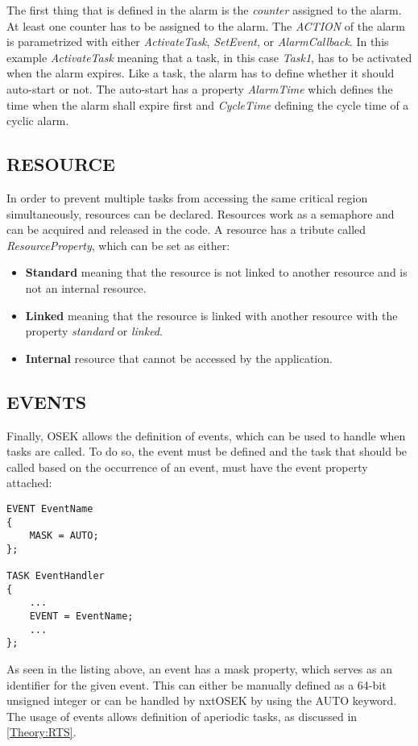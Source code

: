 The first thing that is defined in the alarm is the \textit{counter} assigned to the alarm.
At least one counter has to be assigned to the alarm.
The \textit{ACTION} of the alarm is parametrized with either \textit{ActivateTask}, \textit{SetEvent}, or \textit{AlarmCallback}\cite{irisa25}.
In this example \textit{ActivateTask} meaning that a task, in this case \textit{Task1}, has to be activated when the alarm expires.
Like a task, the alarm has to define whether it should auto-start or not.
The auto-start has a property \textit{AlarmTime} which defines the time when the alarm shall expire first and \textit{CycleTime} defining the cycle time of a cyclic alarm\cite{irisa25}.

\subsection{RESOURCE}
In order to prevent multiple tasks from accessing the same critical region simultaneously, resources can be declared.
Resources work as a semaphore and can be acquired and released in the code.
A resource has a tribute called \textit{ResourceProperty}, which can be set as either:
\begin{itemize}
\item \textbf{Standard} meaning that the resource is not linked to another resource and is not an internal resource.
\item \textbf{Linked} meaning that the resource is linked with another resource with the property \textit{standard} or \textit{linked}.
\item \textbf{Internal} resource that cannot be accessed by the application\cite{irisa25}.
\end{itemize}

\subsection{EVENTS}
Finally, OSEK allows the definition of events, which can be used to handle when tasks are called.
To do so, the event must be defined and the task that should be called based on the occurrence of an event, must have the event property attached:
\begin{lstlisting}
EVENT EventName
{
    MASK = AUTO;
};

TASK EventHandler
{
    ...
    EVENT = EventName;
    ...
};
\end{lstlisting}
As seen in the listing above, an event has a mask property, which serves as an identifier for the given event\cite{irisa25}.
This can either be manually defined as a 64-bit unsigned integer or can be handled by nxtOSEK by using the AUTO keyword.
The usage of events allows definition of aperiodic tasks, as discussed in \autoref{Theory:RTS}.
